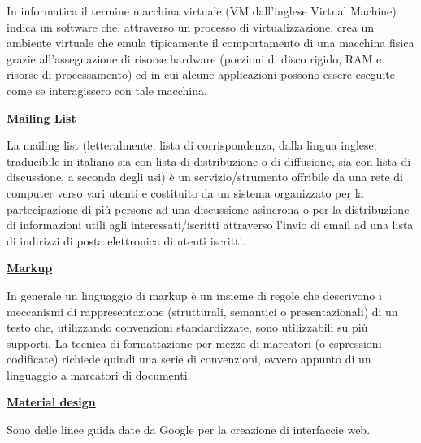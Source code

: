 \medskip
\begin{addmargin}[5em]{1em}
In informatica il termine macchina virtuale (VM dall'inglese Virtual Machine) indica un software che, attraverso un processo di virtualizzazione, crea un ambiente virtuale che emula tipicamente il comportamento di una macchina fisica grazie all'assegnazione di risorse hardware (porzioni di disco rigido, RAM e risorse di processamento) ed in cui alcune applicazioni possono essere eseguite come se interagissero con tale macchina.
\end{addmargin}	

\bigskip
\begin{addmargin}[0em]{0em}	
	\textbf{\underline{Mailing List}}
\end{addmargin}

\medskip
\begin{addmargin}[5em]{1em}	
La mailing list (letteralmente, lista di corrispondenza, dalla lingua inglese; traducibile in italiano sia con lista di distribuzione o di diffusione, sia con lista di discussione, a seconda degli usi) è un servizio/strumento offribile da una rete di computer verso vari utenti e costituito da un sistema organizzato per la partecipazione di più persone ad una discussione asincrona o per la distribuzione di informazioni utili agli interessati/iscritti attraverso l'invio di email ad una lista di indirizzi di posta elettronica di utenti iscritti.
\end{addmargin}	

\bigskip
\begin{addmargin}[0em]{0em}	
	\textbf{\underline{Markup}} 
\end{addmargin}

\medskip
\begin{addmargin}[5em]{1em}
In generale un linguaggio di markup è un insieme di regole che descrivono i meccanismi di rappresentazione (strutturali, semantici o presentazionali) di un testo che, utilizzando convenzioni standardizzate, sono utilizzabili su più supporti. La tecnica di formattazione per mezzo di marcatori (o espressioni codificate) richiede quindi una serie di convenzioni, ovvero appunto di un linguaggio a marcatori di documenti. 	
\end{addmargin}	

\bigskip
\begin{addmargin}[0em]{0em}	
	\textbf{\underline{Material design}}
\end{addmargin}
	
\medskip
\begin{addmargin}[5em]{1em}
Sono delle linee guida date da Google per la creazione di interfaccie web.	
\end{addmargin}	

